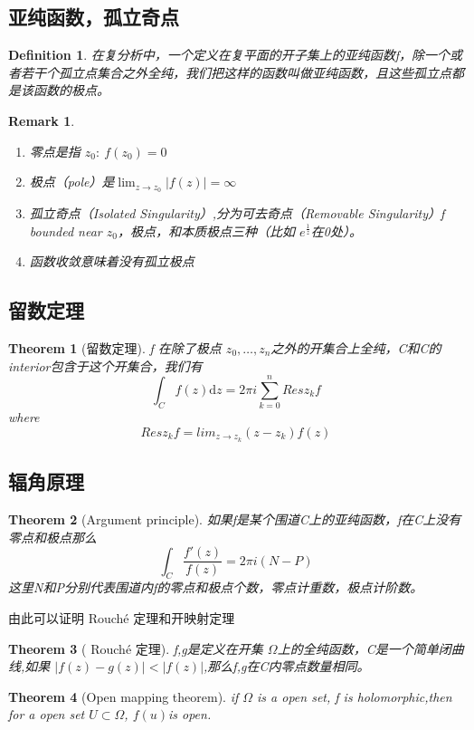 \documentclass{article}
\newtheorem{theorem}{Theorem}
\newtheorem{definition}{Definition}
\newtheorem{remark}{Remark}
\begin{document}
\subsection{亚纯函数，孤立奇点}
\begin{definition}
    在复分析中，一个定义在复平面的开子集上的亚纯函数f，除一个或者若干个孤立点集合之外全纯，我们把这样的函数叫做亚纯函数，且这些孤立点都是该函数的极点。
\end{definition}
\begin{remark}
    \begin{enumerate}
        \item 零点是指 $ z_0:\ f(z_0)=0 $
        \item 极点（pole）是$\lim_{z\rightarrow z_0}\left\lvert f(z) \right\rvert=\infty $
        \item 孤立奇点（Isolated Singularity）,分为可去奇点（Removable Singularity）f bounded near $ z_0$，极点，和本质极点三种（比如 $ e^{\frac{1}{z}} $在0处）。
        \item 函数收敛意味着没有孤立极点
    \end{enumerate}
\end{remark}
\subsection{留数定理}
\begin{theorem}[留数定理]
    f 在除了极点 $ z_0,\dots, z_n$之外的开集合上全纯，C和C的interior包含于这个开集合，我们有
    \begin{equation}
        \int_{C}f(z)\mathrm{d}z=2\pi i \sum_{k=0}^{n}Res z_kf
    \end{equation}
    where \[Resz_kf=lim_{z\rightarrow z_k}(z-z_k)f(z) \]
\end{theorem}
\subsection{辐角原理}

\begin{theorem}[Argument principle]
    如果f是某个围道C上的亚纯函数，f在C上没有零点和极点那么
    \begin{equation}
        \int_{C}^{}\frac{f'(z)}{f(z)}=2\pi i (N-P)
    \end{equation}
    这里N和P分别代表围道内f的零点和极点个数，零点计重数，极点计阶数。
\end{theorem}
由此可以证明 Rouché 定理和开映射定理
\begin{theorem}[ Rouché 定理]
    f,g是定义在开集 $ \Omega $上的全纯函数，C是一个简单闭曲线,如果 $ \left\lvert f(z)-g(z)  \right\rvert<\left\lvert f(z) \right\rvert $,那么f,g在C内零点数量相同。
\end{theorem}
\begin{theorem}[Open mapping theorem]
    if $ \Omega $ is a open set, f is holomorphic,then for a open set $ U \subset \Omega $, $ f(u) $is open. 
\end{theorem}
\end{document}
